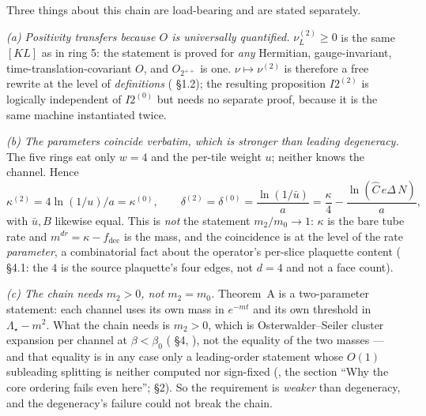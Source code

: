\noindent Three things about this chain are load-bearing and are stated separately.

\emph{(a) Positivity transfers because $O$ is universally quantified.} $\nu^{(2)}_L\ge0$ is the
same $[KL]$ as in ring 5: the statement is proved for \emph{any} Hermitian, gauge-invariant,
time-translation-covariant $O$, and $O_{2^{++}}$ is one. $\nu\mapsto\nu^{(2)}$ is therefore a
free rewrite at the level of \emph{definitions} ( \S1.2); the resulting
proposition $I2^{(2)}$ is logically independent of $I2^{(0)}$ but needs no separate proof,
because it is the same machine instantiated twice.

\emph{(b) The parameters coincide verbatim, which is stronger than leading degeneracy.} The five
rings eat only $w=4$ and the per-tile weight $u$; neither knows the channel. Hence
\begin{equation}
\kappa^{(2)}=4\ln(1/u)/a=\kappa^{(0)},\qquad
\delta^{(2)}=\delta^{(0)}=\frac{\ln(1/\bar u)}{a}
=\frac{\kappa}{4}-\frac{\ln(\hat C\,e\Delta\,N)}{a},
\label{eq:u1-kappa}
\end{equation}
with $\bar u,B$ likewise equal. This is \emph{not} the statement $m_2/m_0\to1$: $\kappa$ is the
bare tube rate and $m^{dr}=\kappa-f_{\mathrm{dec}}$ is the mass, and the coincidence is at the
level of the rate \emph{parameter}, a combinatorial fact about the operator's per-slice plaquette
content ( \S4.1: the $4$ is the source plaquette's four edges, not $d=4$
and not a face count). \LT{}

\emph{(c) The chain needs $m_2>0$, not $m_2=m_0$.} Theorem~A is a two-parameter statement: each
channel uses its own mass in $e^{-mt}$ and its own threshold in $\Lambda_\star-m^2$. What the
chain needs is $m_2>0$, which is Osterwalder--Seiler cluster expansion per channel at
$\beta<\beta_0$ ( \S4, \code{[T]}), not the equality of the two masses --- and
that equality is in any case only a leading-order statement whose $O(1)$ subleading splitting is
neither computed nor sign-fixed (, the section ``Why the core ordering fails
even here'';  \S2). So the requirement is \emph{weaker} than degeneracy, and
the degeneracy's failure could not break the chain.

